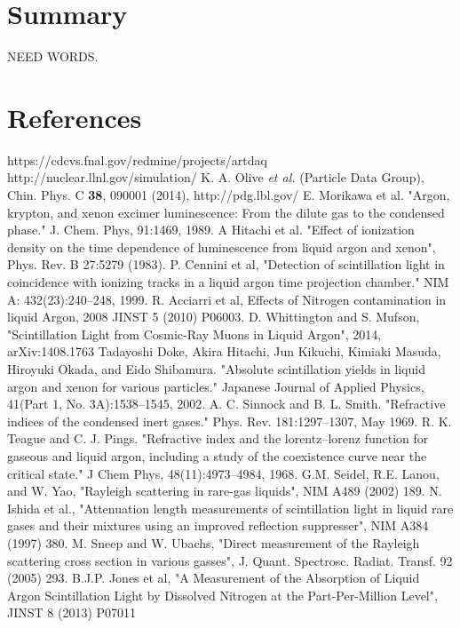 \documentclass[12pt]{elsarticle}
\begin{document}
{\section{Summary}
NEED WORDS.
\section{References}

\begin{thebibliography}{99}

 https://cdcvs.fnal.gov/redmine/projects/artdaq
 http://nuclear.llnl.gov/simulation/
 K. A. Olive {\it et al.} (Particle Data Group), Chin. Phys. C {\bf 38}, 090001 (2014), http://pdg.lbl.gov/
 E. Morikawa et al. "Argon, krypton, and xenon excimer luminescence: From the dilute gas to the condensed phase." J. Chem. Phys, 91:1469, 1989.
 A Hitachi et al. "Effect of ionization density on the time dependence of luminescence from liquid argon and xenon", Phys. Rev. B 27:5279 (1983). P. Cennini et al, "Detection of scintillation light in coincidence with ionizing tracks in a liquid argon time projection chamber." NIM A: 432(23):240–248, 1999.  R. Acciarri et al, Effects of Nitrogen contamination in liquid Argon, 2008 JINST 5 (2010) P06003.  D. Whittington and S. Mufson, "Scintillation Light from Cosmic-Ray Muons in Liquid Argon", 2014, arXiv:1408.1763
 Tadayoshi Doke, Akira Hitachi, Jun Kikuchi, Kimiaki Masuda, Hiroyuki Okada, and Eido Shibamura. "Absolute scintillation yields in liquid argon and xenon for various particles." Japanese Journal of Applied Physics, 41(Part 1, No. 3A):1538–1545, 2002.
 A. C. Sinnock and B. L. Smith. "Refractive indices of the condensed inert gases." Phys. Rev. 181:1297–1307, May 1969.   R. K. Teague and C. J. Pings. "Refractive index and the lorentz–lorenz function for gaseous and liquid argon, including a study of the coexistence curve near the critical state." J Chem Phys, 48(11):4973–4984, 1968.
 G.M. Seidel, R.E. Lanou, and W. Yao, "Rayleigh scattering in rare-gas liquids", NIM A489 (2002) 189.   N. Ishida et al., "Attenuation length measurements of scintillation light in liquid rare gases and their mixtures using an improved reflection suppresser", NIM A384 (1997) 380. M. Sneep and W. Ubachs, "Direct measurement of the Rayleigh scattering cross section in various gasses", J. Quant. Spectrosc. Radiat. Transf. 92 (2005) 293.
 B.J.P. Jones et al, "A Measurement of the Absorption of Liquid Argon Scintillation Light by Dissolved Nitrogen at the Part-Per-Million Level", JINST 8 (2013) P07011


\end{thebibliography}}
\end{document}
